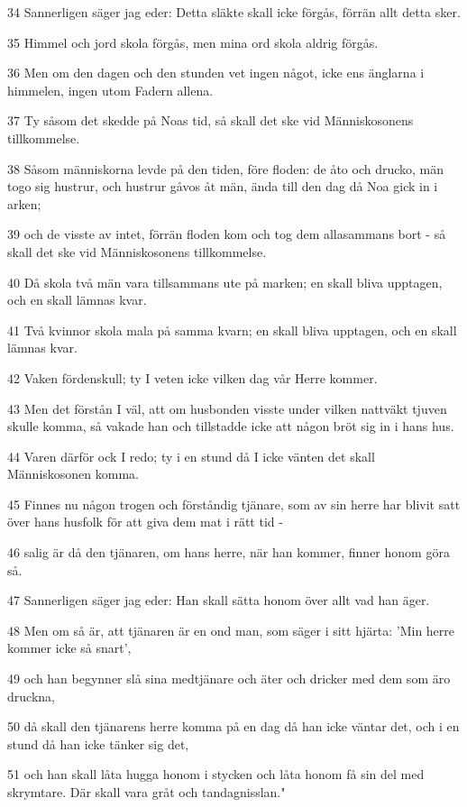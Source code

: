\par 34 Sannerligen säger jag eder: Detta släkte skall icke förgås, förrän allt detta sker.
\par 35 Himmel och jord skola förgås, men mina ord skola aldrig förgås.
\par 36 Men om den dagen och den stunden vet ingen något, icke ens änglarna i himmelen, ingen utom Fadern allena.
\par 37 Ty såsom det skedde på Noas tid, så skall det ske vid Människosonens tillkommelse.
\par 38 Såsom människorna levde på den tiden, före floden: de åto och drucko, män togo sig hustrur, och hustrur gåvos åt män, ända till den dag då Noa gick in i arken;
\par 39 och de visste av intet, förrän floden kom och tog dem allasammans bort - så skall det ske vid Människosonens tillkommelse.
\par 40 Då skola två män vara tillsammans ute på marken; en skall bliva upptagen, och en skall lämnas kvar.
\par 41 Två kvinnor skola mala på samma kvarn; en skall bliva upptagen, och en skall lämnas kvar.
\par 42 Vaken fördenskull; ty I veten icke vilken dag vår Herre kommer.
\par 43 Men det förstån I väl, att om husbonden visste under vilken nattväkt tjuven skulle komma, så vakade han och tillstadde icke att någon bröt sig in i hans hus.
\par 44 Varen därför ock I redo; ty i en stund då I icke vänten det skall Människosonen komma.
\par 45 Finnes nu någon trogen och förståndig tjänare, som av sin herre har blivit satt över hans husfolk för att giva dem mat i rätt tid -
\par 46 salig är då den tjänaren, om hans herre, när han kommer, finner honom göra så.
\par 47 Sannerligen säger jag eder: Han skall sätta honom över allt vad han äger.
\par 48 Men om så är, att tjänaren är en ond man, som säger i sitt hjärta: 'Min herre kommer icke så snart',
\par 49 och han begynner slå sina medtjänare och äter och dricker med dem som äro druckna,
\par 50 då skall den tjänarens herre komma på en dag då han icke väntar det, och i en stund då han icke tänker sig det,
\par 51 och han skall låta hugga honom i stycken och låta honom få sin del med skrymtare. Där skall vara gråt och tandagnisslan."

